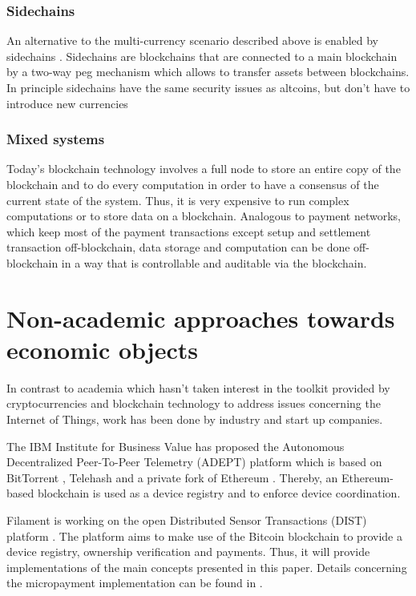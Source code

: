 \documentclass[10pt, conference,compsoc]{IEEEtran}
\begin{document}
\subsubsection*{Sidechains}

An alternative to the multi-currency scenario described above is enabled by sidechains \cite{back2014enabling}. Sidechains are blockchains that are connected to a main blockchain by a two-way peg mechanism which allows to transfer assets between blockchains. In principle sidechains have the same security issues as altcoins, but don't have to introduce new currencies

\subsubsection*{Mixed systems}

Today's blockchain technology involves a full node to store an entire copy of the blockchain and to do every computation in order to have a consensus of the current state of the system. Thus, it is very expensive to run complex computations or to store data on a blockchain. Analogous to payment networks, which keep most of the payment transactions except setup and settlement transaction off-blockchain, data storage and computation can be done off-blockchain in a way that is controllable and auditable via the blockchain.

\section{Non-academic approaches towards economic objects}

In contrast to academia which hasn't taken interest in the toolkit provided by cryptocurrencies and blockchain technology to address issues concerning the Internet of Things, work has been done by industry and start up companies.  

The IBM Institute for Business Value has proposed the Autonomous Decentralized Peer-To-Peer Telemetry (ADEPT) platform  \cite{brody2014device,pureswaran2015empowering} which is based on BitTorrent \cite{cohen2008bittorrent}, Telehash \cite{Telehash} and a private fork of Ethereum \cite{buterin2014ethereum}. Thereby, an Ethereum-based blockchain is used as a device registry and to enforce device coordination.

Filament is working on the open Distributed Sensor Transactions (DIST) platform \cite{filament}. The platform aims to make use of the Bitcoin blockchain to provide a device registry, ownership verification and payments. Thus, it will provide implementations of the main concepts presented in this paper. Details concerning the micropayment implementation can be found in \cite{pennybank}.
\end{document}
